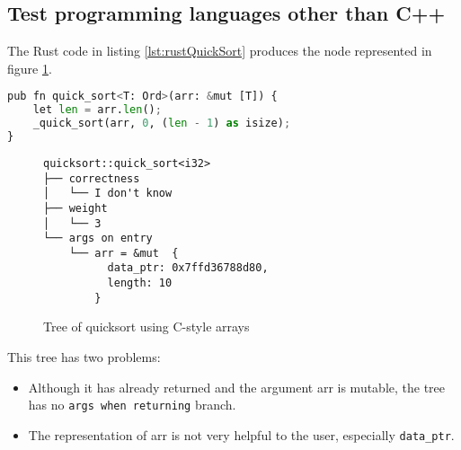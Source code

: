 \subsection{Test programming languages other than C++}
The Rust code in listing \ref{lst:rustQuickSort} produces the node represented in figure \ref{fig:rustQuickSortTree}.
\begin{lstlisting}[language=Python, caption=QuickSort in Rust, frame=tb, label={lst:rustQuickSort}]
pub fn quick_sort<T: Ord>(arr: &mut [T]) {
    let len = arr.len();
    _quick_sort(arr, 0, (len - 1) as isize);
}
\end{lstlisting}
\begin{figure}[h]
\caption{Tree of quicksort using C-style arrays}
\label{fig:rustQuickSortTree}
\begin{verbatim}
quicksort::quick_sort<i32>                                                                                                                            
├── correctness                                                                                                                                       
│   └── I don't know                                                                                                                                  
├── weight                                                                                                                                            
│   └── 3                                                                                                                                             
└── args on entry                                                                                                                                     
    └── arr = &mut  {                                                                                                                                 
          data_ptr: 0x7ffd36788d80,                                                                                                                   
          length: 10                                                                                                                                  
        }
\end{verbatim}
\end{figure}
This tree has two problems:
\begin{itemize}
    \item Although it has already returned and the argument arr is mutable, the tree has no \verb|args when returning| branch.
    \item The representation of arr is not very helpful to the user, especially \verb|data_ptr|.
\end{itemize}
